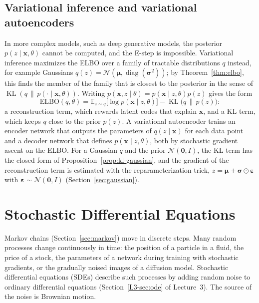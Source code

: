 \documentclass[11pt]{article}
\newcommand{\E}{\mathbb{E}}
\DeclareMathOperator{\KL}{KL}
\theoremstyle{definition}
\theoremstyle{plain}
\theoremstyle{remark}
\DeclareMathOperator{\diag}{diag}
\begin{document}
\subsection{Variational inference and variational autoencoders}

In more complex models, such as deep generative models, the posterior $p(z \mid \mathbf{x}, \theta)$ cannot be computed, and the E-step is impossible. Variational inference maximizes the ELBO over a family of tractable distributions $q$ instead, for example Gaussians $q(z) = \mathcal{N}(\boldsymbol{\mu}, \diag(\boldsymbol{\sigma}^2))$; by Theorem~\ref{thm:elbo}, this finds the member of the family that is closest to the posterior in the sense of $\KL(q \,\|\, p(\cdot \mid \mathbf{x}, \theta))$. Writing $p(\mathbf{x}, z \mid \theta) = p(\mathbf{x} \mid z, \theta)p(z)$ gives the form
\[\mathrm{ELBO}(q, \theta) = \E_{z \sim q}\big[\log p(\mathbf{x} \mid z, \theta)\big] - \KL\big(q \,\|\, p(z)\big):\]
a reconstruction term, which rewards latent codes that explain $\mathbf{x}$, and a KL term, which keeps $q$ close to the prior $p(z)$. A variational autoencoder trains an encoder network that outputs the parameters of $q(z \mid \mathbf{x})$ for each data point and a decoder network that defines $p(\mathbf{x} \mid z, \theta)$, both by stochastic gradient ascent on the ELBO. For a Gaussian $q$ and the prior $\mathcal{N}(\mathbf{0}, I)$, the KL term has the closed form of Proposition~\ref{prop:kl-gaussian}, and the gradient of the reconstruction term is estimated with the reparameterization trick, $z = \boldsymbol{\mu} + \boldsymbol{\sigma} \odot \boldsymbol{\varepsilon}$ with $\boldsymbol{\varepsilon} \sim \mathcal{N}(\mathbf{0}, I)$ (Section~\ref{sec:gaussian}).

\section{Stochastic Differential Equations}\label{sec:sde}

Markov chains (Section~\ref{sec:markov}) move in discrete steps. Many random processes change continuously in time: the position of a particle in a fluid, the price of a stock, the parameters of a network during training with stochastic gradients, or the gradually noised images of a diffusion model. Stochastic differential equations (SDEs) describe such processes by adding random noise to ordinary differential equations (Section~\ref{L3-sec:ode} of Lecture~3). The source of the noise is Brownian motion.
\end{document}
